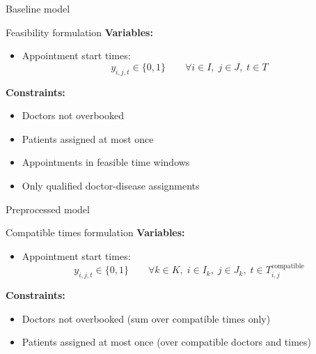 \documentclass{beamer}
\begin{document}
\begin{frame}{Baseline model}
    \begin{block}{Feasibility formulation}
        \textbf{Variables:}
        \begin{itemize}
            \item Appointment start times: 
            \[
            y_{i,j,t} \in \{0,1\} \qquad \forall i \in I, \;j \in J,\; t \in T
            \]
        \end{itemize}
        \textbf{Constraints:}
        \begin{itemize}
            \item Doctors not overbooked
            \item Patients assigned at most once
            \item Appointments in feasible time windows
            \item Only qualified doctor-disease assignments
        \end{itemize}
    \end{block}
\end{frame}

\begin{frame}{Preprocessed model}
    \begin{block}{Compatible times formulation}
        \textbf{Variables:}
        \begin{itemize}
            \item Appointment start times: 
            \[
            y_{i,j,t} \in \{0,1\} \qquad \forall k \in K, \;i \in I_k, \;j \in J_k, \;t \in T^\mathrm{compatible}_{i,j}
            \]
        \end{itemize}
        \textbf{Constraints:}
        \begin{itemize}
            \item Doctors not overbooked (sum over compatible times only)
            \item Patients assigned at most once (over compatible doctors and times)
        \end{itemize}
    \end{block}
\end{frame}
\end{document}
